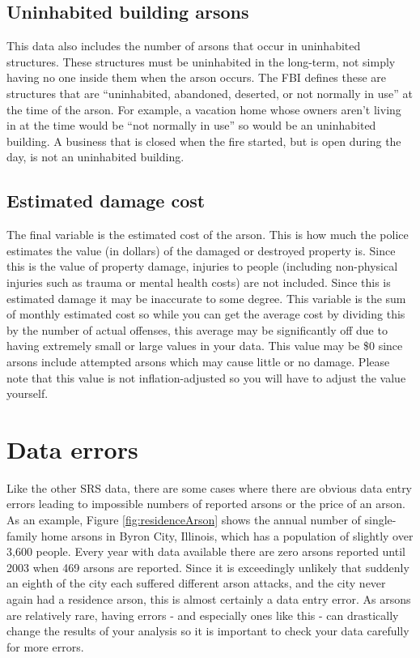 \documentclass[
  12pt,
  openany]{book}
\begin{document}
\subsection{Uninhabited building arsons}\label{uninhabited-building-arsons}

This data also includes the number of arsons that occur in uninhabited structures. These structures must be uninhabited in the long-term, not simply having no one inside them when the arson occurs. The FBI defines these are structures that are ``uninhabited, abandoned, deserted, or not normally in use'' at the time of the arson. For example, a vacation home whose owners aren't living in at the time would be ``not normally in use'' so would be an uninhabited building. A business that is closed when the fire started, but is open during the day, is not an uninhabited building.

\subsection{Estimated damage cost}\label{estimated-damage-cost}

The final variable is the estimated cost of the arson. This is how much the police estimates the value (in dollars) of the damaged or destroyed property is. Since this is the value of property damage, injuries to people (including non-physical injuries such as trauma or mental health costs) are not included. Since this is estimated damage it may be inaccurate to some degree. This variable is the sum of monthly estimated cost so while you can get the average cost by dividing this by the number of actual offenses, this average may be significantly off due to having extremely small or large values in your data. This value may be \$0 since arsons include attempted arsons which may cause little or no damage. Please note that this value is not inflation-adjusted so you will have to adjust the value yourself.

\section{Data errors}\label{data-errors-1}

Like the other SRS data, there are some cases where there are obvious data entry errors leading to impossible numbers of reported arsons or the price of an arson. As an example, Figure \ref{fig:residenceArson} shows the annual number of single-family home arsons in Byron City, Illinois, which has a population of slightly over 3,600 people. Every year with data available there are zero arsons reported until 2003 when 469 arsons are reported. Since it is exceedingly unlikely that suddenly an eighth of the city each suffered different arson attacks, and the city never again had a residence arson, this is almost certainly a data entry error. As arsons are relatively rare, having errors - and especially ones like this - can drastically change the results of your analysis so it is important to check your data carefully for more errors.
\end{document}

